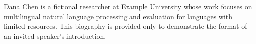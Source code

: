 Dana Chen is a fictional researcher at Example University whose work focuses
on multilingual natural language processing and evaluation for languages
with limited resources. This biography is provided only to demonstrate the
format of an invited speaker's introduction.
